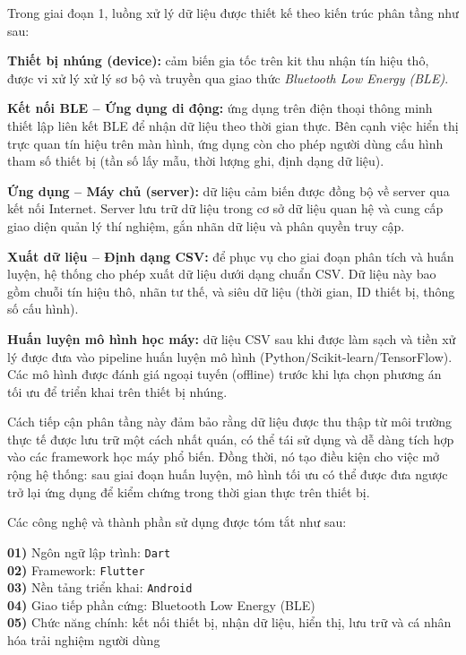 Trong giai đoạn 1, luồng xử lý dữ liệu được thiết kế theo kiến trúc phân tầng như sau:

\textbf{Thiết bị nhúng (device):} cảm biến gia tốc trên kit thu nhận tín hiệu thô, được vi xử lý xử lý sơ bộ và truyền qua giao thức \textit{Bluetooth Low Energy (BLE)}.

\textbf{Kết nối BLE – Ứng dụng di động:} ứng dụng trên điện thoại thông minh thiết lập liên kết BLE để nhận dữ liệu theo thời gian thực. Bên cạnh việc hiển thị trực quan tín hiệu trên màn hình, ứng dụng còn cho phép người dùng cấu hình tham số thiết bị (tần số lấy mẫu, thời lượng ghi, định dạng dữ liệu).

\textbf{Ứng dụng – Máy chủ (server):} dữ liệu cảm biến được đồng bộ về server qua kết nối Internet. Server lưu trữ dữ liệu trong cơ sở dữ liệu quan hệ và cung cấp giao diện quản lý thí nghiệm, gắn nhãn dữ liệu và phân quyền truy cập.

\textbf{Xuất dữ liệu – Định dạng CSV:} để phục vụ cho giai đoạn phân tích và huấn luyện, hệ thống cho phép xuất dữ liệu dưới dạng chuẩn CSV. Dữ liệu này bao gồm chuỗi tín hiệu thô, nhãn tư thế, và siêu dữ liệu (thời gian, ID thiết bị, thông số cấu hình).

\textbf{Huấn luyện mô hình học máy:} dữ liệu CSV sau khi được làm sạch và tiền xử lý được đưa vào pipeline huấn luyện mô hình (Python/Scikit-learn/TensorFlow). Các mô hình được đánh giá ngoại tuyến (offline) trước khi lựa chọn phương án tối ưu để triển khai trên thiết bị nhúng.

Cách tiếp cận phân tầng này đảm bảo rằng dữ liệu được thu thập từ môi trường thực tế được lưu trữ một cách nhất quán, có thể tái sử dụng và dễ dàng tích hợp vào các framework học máy phổ biến. Đồng thời, nó tạo điều kiện cho việc mở rộng hệ thống: sau giai đoạn huấn luyện, mô hình tối ưu có thể được đưa ngược trở lại ứng dụng để kiểm chứng trong thời gian thực trên thiết bị.

Các công nghệ và thành phần sử dụng được tóm tắt như sau:

\begin{flushleft}
\textbf{01)} Ngôn ngữ lập trình: \texttt{Dart} \\
\textbf{02)} Framework: \texttt{Flutter} \\
\textbf{03)} Nền tảng triển khai: \texttt{Android} \\
\textbf{04)} Giao tiếp phần cứng: Bluetooth Low Energy (BLE) \\
\textbf{05)} Chức năng chính: kết nối thiết bị, nhận dữ liệu, hiển thị, lưu trữ và cá nhân hóa trải nghiệm người dùng
\end{flushleft}

